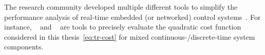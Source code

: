 The research community developed multiple different tools to simplify the performance analysis of real-time embedded (or networked) control systems~\cite{Ohlin:2006}.
For instance, ~\cite{Lincoln:2002} and ~\cite{Cervin:2019} are tools to precisely evaluate the quadratic cost function considered in this thesis~\eqref{eq:tr-cost} for mixed continuous-/discrete-time system components.%
